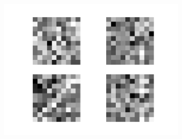 \begin{figure}[h!]
\begin{subfigure}[t]{.19\textwidth}
  		\includegraphics[width=\linewidth]{imgs/inspect/00014.png}
  		\label{fig:sub1}
	\end{subfigure}%
	

\end{figure}
